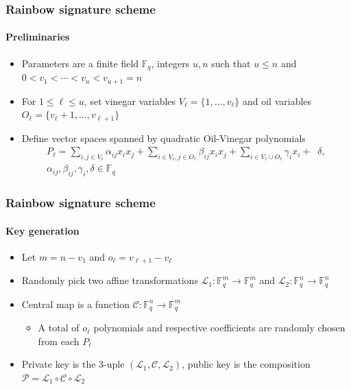 \documentclass[12pt]{beamer}
\begin{document}
\begin{frame}
  \frametitle{Rainbow signature scheme}
  \framesubtitle{Preliminaries}
  \begin{itemize}
    \item Parameters are a finite field $\mathbb{F}_{q}$, integers $u, n$ such
        that $u \leq n$ and $0 < v_{1} < \cdots < v_{u} < v_{u + 1} = n$
    \item For $1 \leq \ell \leq u$, set vinegar variables
        $V_{\ell} = \{1, \dots, v_{\ell}\}$ and oil variables
          $O_{\ell} = \{v_{\ell} + 1, \dots, v_{\ell + 1}\}$
    \item Define vector spaces spanned by quadratic Oil-Vinegar polynomials
    \begin{align*}
      P_{\ell} = \sum_{i, j \in V_{\ell}} \alpha_{ij}  x_{i}  x_{j}
        + \sum_{i \in V_{\ell}, j \in O_{\ell}} \beta_{ij}  x_{i}  x_{j}
        + \sum_{i \in V_{\ell} \cup O_{\ell}} \gamma_{i}  x_{i} + \;\; \delta,
        \\ \alpha_{ij}, \beta_{ij}, \gamma_{i}, \delta \in \mathbb{F}_{q}
    \end{align*}
  \end{itemize}
\end{frame}

\begin{frame}
  \frametitle{Rainbow signature scheme}
  \framesubtitle{Key generation}
  \begin{itemize}
    \item Let $m = n - v_{1}$ and $o_{\ell} = v_{\ell + 1} - v_{\ell}$
    \item Randomly pick two affine transformations
        $\mathcal{L}_{1} : \mathbb{F}_{q}^{m} \to \mathbb{F}_{q}^{m}$ and
        $\mathcal{L}_{2} : \mathbb{F}_{q}^{n} \to \mathbb{F}_{q}^{n}$
    \item Central map is a function
        $\mathcal{C} : \mathbb{F}_{q}^{n} \to \mathbb{F}_{q}^{m}$
      \begin{itemize}
        \item A total of $o_{\ell}$ polynomials and respective coefficients are
            randomly chosen from each $P_{\ell}$
      \end{itemize}
    \item Private key is the $3$-uple
        $(\mathcal{L}_{1}, \mathcal{C}, \mathcal{L}_{2})$, public key is the
          composition $\mathcal{P} = \mathcal{L}_{1} \circ \mathcal{C} \circ
          \mathcal{L}_{2}$
  \end{itemize}
\end{frame}
\end{document}
